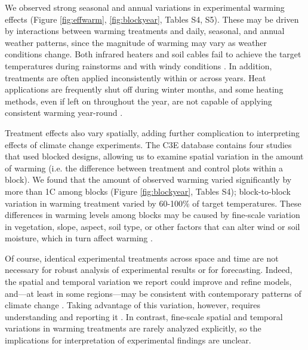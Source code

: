 \documentclass{article}
\begin{document}
\par We observed strong seasonal and annual variations in experimental warming effects (Figure \ref{fig:effwarm}, \ref{fig:blockyear}, Tables S4, S5). These may be driven by interactions between warming treatments and daily, seasonal, and annual weather patterns, since the magnitude of warming may vary as weather conditions change.  Both infrared heaters and soil cables fail to achieve the target temperatures during rainstorms \citep{peterjohn1993,hoeppner2012} and with windy conditions \citep{kimball2005,kimball2008}. In addition, treatments are often applied inconsistently within or across years. Heat applications are frequently shut off during winter months, and some heating methods, even if left on throughout the year, are not capable of applying consistent warming year-round \citep[e.g.][]{clark2014a,clark2014b,hagedorn2010}. 

\par Treatment effects also vary spatially, adding further complication to interpreting effects of climate change experiments. The C3E database contains four studies that used blocked designs, allowing us to examine spatial variation in the amount of warming (i.e. the difference between treatment and control plots within a block). We found that the amount of observed warming varied significantly by more than 1\degree C among blocks (Figure \ref{fig:blockyear}, Tables S4); block-to-block variation in warming treatment varied by 60-100\% of target temperatures. These differences in warming levels among blocks may be caused by fine-scale variation in vegetation, slope, aspect, soil type, or other factors that can alter wind or soil moisture, which in turn affect warming \citep{peterjohn1993,kimball2005,kimball2008,hoeppner2012,rollinson2015}. 

\par Of course, identical experimental treatments across space and time are not necessary for robust analysis of experimental results or for forecasting. Indeed, the spatial and temporal variation we report could improve and refine models, and---at least in some regions---may be consistent with contemporary patterns of climate change \citep{ipcc2013}. Taking advantage of this variation, however, requires understanding and reporting it \citep[e.g.,][]{milcu2016}. In contrast, fine-scale spatial and temporal variations in warming treatments are rarely analyzed explicitly, so the implications for interpretation of experimental findings are unclear.
\end{document}
